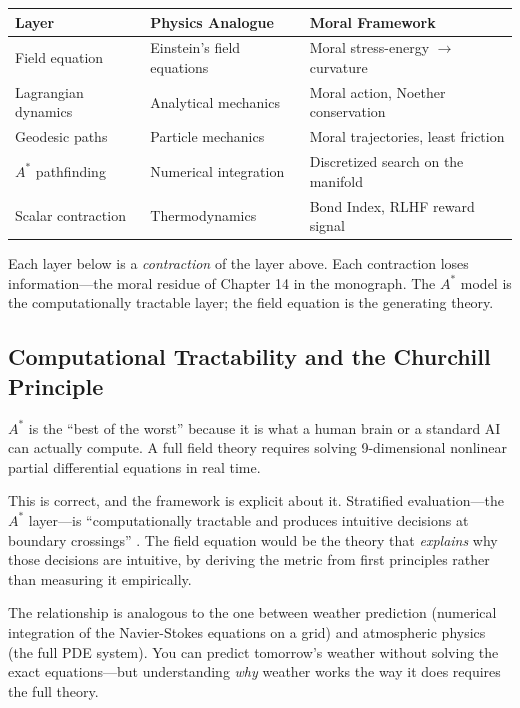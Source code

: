 \documentclass[12pt]{article}
\theoremstyle{definition}
\theoremstyle{remark}
\begin{document}
\begin{center}
\begin{tabular}{lll}
\toprule
\textbf{Layer} & \textbf{Physics Analogue} & \textbf{Moral Framework} \\
\midrule
Field equation & Einstein's field equations & Moral stress-energy $\to$ curvature \\
Lagrangian dynamics & Analytical mechanics & Moral action, Noether conservation \\
Geodesic paths & Particle mechanics & Moral trajectories, least friction \\
$A^*$ pathfinding & Numerical integration & Discretized search on the manifold \\
Scalar contraction & Thermodynamics & Bond Index, RLHF reward signal \\
\bottomrule
\end{tabular}
\end{center}

Each layer below is a \emph{contraction} of the layer above. Each contraction loses information---the moral residue of Chapter 14 in the monograph. The $A^*$ model is the computationally tractable layer; the field equation is the generating theory.

\subsection{Computational Tractability and the Churchill Principle}

$A^*$ is the ``best of the worst'' because it is what a human brain or a standard AI can actually compute. A full field theory requires solving 9-dimensional nonlinear partial differential equations in real time.

This is correct, and the framework is explicit about it. Stratified evaluation---the $A^*$ layer---is ``computationally tractable and produces intuitive decisions at boundary crossings'' \citep[\S9]{anonymous2026ge}. The field equation would be the theory that \emph{explains} why those decisions are intuitive, by deriving the metric from first principles rather than measuring it empirically.

The relationship is analogous to the one between weather prediction (numerical integration of the Navier-Stokes equations on a grid) and atmospheric physics (the full PDE system). You can predict tomorrow's weather without solving the exact equations---but understanding \emph{why} weather works the way it does requires the full theory.
\end{document}
